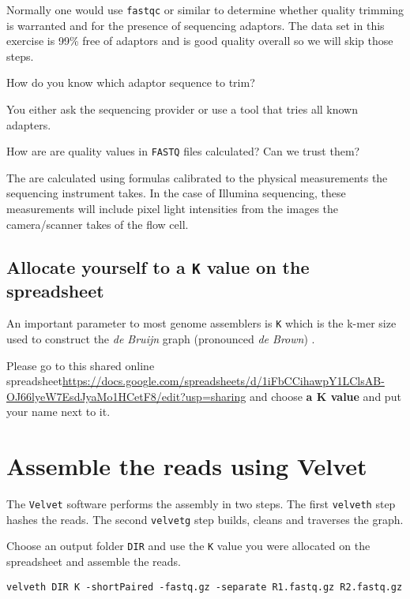 Normally one would use \texttt{fastqc} or similar to determine whether
quality trimming is warranted and for the presence of sequencing adaptors.
The data set in this exercise is 99\% free of adaptors and is good quality
overall so we will skip those steps.
\begin{questions}
How do you know which adaptor sequence to trim? \\
\begin{answer}
You either ask the sequencing provider or use a tool that tries all known adapters.
\end{answer}
How are are quality values in \texttt{FASTQ} files calculated? Can we trust them? \\
\begin{answer}
The are calculated using formulas calibrated to the physical measurements the
sequencing instrument takes. In the case of Illumina sequencing, these measurements
will include pixel light intensities from the images the camera/scanner takes
of the flow cell.
\end{answer}
\end{questions}

\subsection{Allocate yourself to a \texttt{K} value on the spreadsheet}

An important parameter to most genome assemblers is \texttt{K} which is the
k-mer size used to construct the \textit{de Bruijn} graph (pronounced \textit{de Brown}) .

Please go to this shared online spreadsheet\url{https://docs.google.com/spreadsheets/d/1iFbCCihawpY1LClsAB-OJ66lyeW7EsdJyaMo1HCetF8/edit?usp=sharing}
and choose \textbf{a K value} and put your name next to it.

\section{Assemble the reads using Velvet}
The \texttt{Velvet} software performs the assembly in two steps. The first \texttt{velveth}
step hashes the reads. The second \texttt{velvetg} step builds, cleans and traverses the graph.

\begin{steps}
Choose an output folder \texttt{DIR} and use the \texttt{K} value you were allocated on the spreadsheet and assemble the reads.
\begin{lstlisting}
velveth DIR K -shortPaired -fastq.gz -separate R1.fastq.gz R2.fastq.gz
\end{lstlisting}
\end{steps}

